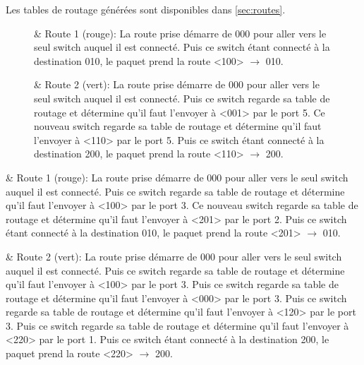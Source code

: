 \documentclass{report}
\begin{document}
			Les tables de routage générées sont disponibles dans \autoref{sec:routes}.
			
			\begin{figure}[H]
				\begin{minipage}{0.74\textwidth}
				\end{minipage}
				\begin{minipage}{0.25\textwidth}
					\begin{easylist}
						& Route 1 (rouge): La route prise démarre de 000 pour aller vers le seul switch auquel il est connecté. Puis ce switch étant connecté à la destination 010, le paquet prend la route <100> $\rightarrow$ 010.
						
						& Route 2 (vert): La route prise démarre de 000 pour aller vers le seul switch auquel il est connecté. Puis ce switch regarde sa table de routage et détermine qu'il faut l'envoyer à <001> par le port 5. Ce nouveau switch regarde sa table de routage et détermine qu'il faut l'envoyer à <110> par le port 5. Puis ce switch étant connecté à la destination 200, le paquet prend la route <110> $\rightarrow$ 200.
					\end{easylist}
				\end{minipage}
			\end{figure}
			
			
			\begin{easylist}
						& Route 1 (rouge): La route prise démarre de 000 pour aller vers le seul switch auquel il est connecté. Puis ce switch regarde sa table de routage et détermine qu'il faut l'envoyer à <100> par le port 3. Ce nouveau switch regarde sa table de routage et détermine qu'il faut l'envoyer à <201> par le port 2. Puis ce switch étant connecté à la destination 010, le paquet prend la route <201> $\rightarrow$ 010.
						
						& Route 2 (vert): La route prise démarre de 000 pour aller vers le seul switch auquel il est connecté. Puis ce switch regarde sa table de routage et détermine qu'il faut l'envoyer à <100> par le port 3. Puis ce switch regarde sa table de routage et détermine qu'il faut l'envoyer à <000> par le port 3. Puis ce switch regarde sa table de routage et détermine qu'il faut l'envoyer à <120> par le port 3. Puis ce switch regarde sa table de routage et détermine qu'il faut l'envoyer à <220> par le port 1. Puis ce switch étant connecté à la destination 200, le paquet prend la route <220> $\rightarrow$ 200.
					\end{easylist}
						
\end{document}

